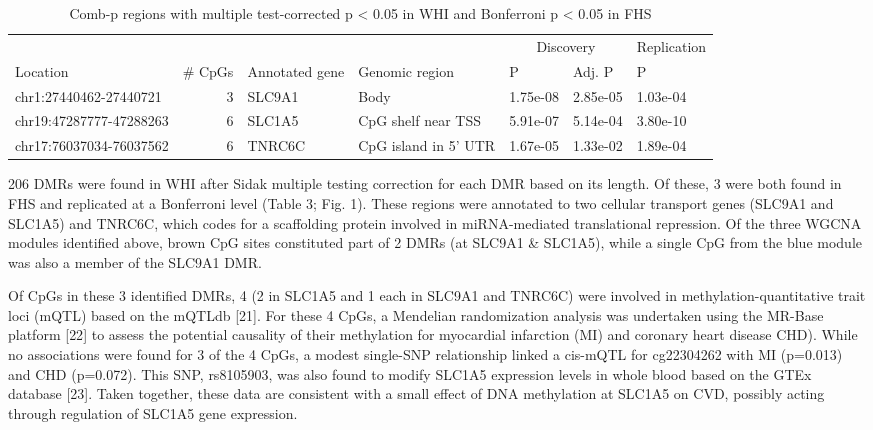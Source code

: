 \documentclass[]{bmcart}
\begin{document}
\begin{table}[t]

\caption{\label{tab:combp-results}Comb-p regions with multiple test-corrected p < 0.05 in WHI and Bonferroni p < 0.05 in FHS}
\centering
\begin{tabular}{lrlllll}
\toprule
\multicolumn{1}{c}{} & \multicolumn{1}{c}{} & \multicolumn{1}{c}{} & \multicolumn{1}{c}{} & \multicolumn{2}{c}{Discovery} & \multicolumn{1}{c}{Replication} \\
\cmidrule(l{3pt}r{3pt}){5-6} \cmidrule(l{3pt}r{3pt}){7-7}
Location & \# CpGs & Annotated gene & Genomic region & P & Adj. P & P\\
\midrule
chr1:27440462-27440721 & 3 & SLC9A1 & Body & 1.75e-08 & 2.85e-05 & 1.03e-04\\
chr19:47287777-47288263 & 6 & SLC1A5 & CpG shelf near TSS & 5.91e-07 & 5.14e-04 & 3.80e-10\\
chr17:76037034-76037562 & 6 & TNRC6C & CpG island in 5' UTR & 1.67e-05 & 1.33e-02 & 1.89e-04\\
\bottomrule
\end{tabular}
\end{table}

206 DMRs were found in WHI after Sidak multiple testing correction for
each DMR based on its length. Of these, 3 were both found in FHS and
replicated at a Bonferroni level (Table 3; Fig. 1). These regions were
annotated to two cellular transport genes (SLC9A1 and SLC1A5) and
TNRC6C, which codes for a scaffolding protein involved in miRNA-mediated
translational repression. Of the three WGCNA modules identified above,
brown CpG sites constituted part of 2 DMRs (at SLC9A1 \& SLC1A5), while
a single CpG from the blue module was also a member of the SLC9A1 DMR.

Of CpGs in these 3 identified DMRs, 4 (2 in SLC1A5 and 1 each in SLC9A1
and TNRC6C) were involved in methylation-quantitative trait loci (mQTL)
based on the mQTLdb {[}21{]}. For these 4 CpGs, a Mendelian
randomization analysis was undertaken using the MR-Base platform
{[}22{]} to assess the potential causality of their methylation for
myocardial infarction (MI) and coronary heart disease CHD). While no
associations were found for 3 of the 4 CpGs, a modest single-SNP
relationship linked a cis-mQTL for cg22304262 with MI (p=0.013) and CHD
(p=0.072). This SNP, rs8105903, was also found to modify SLC1A5
expression levels in whole blood based on the GTEx database {[}23{]}.
Taken together, these data are consistent with a small effect of DNA
methylation at SLC1A5 on CVD, possibly acting through regulation of
SLC1A5 gene expression.
\end{document}
